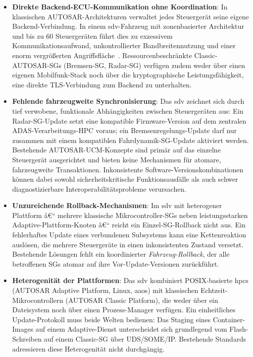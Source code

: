 ﻿\documentclass[12pt,a4paper,twoside]{article}
\begin{document}
\begin{itemize}[leftmargin=*]
  \item \textbf{Direkte Backend-ECU-Kommunikation ohne Koordination}:
    In klassischen AUTO\-SAR-Architekturen verwaltet jedes Steuergerät
    seine eigene Backend-Verbindung. In einem \gls{sdv}-Fahrzeug mit
    zonenbasierter Architektur und bis zu 60 Steuergeräten führt dies
    zu exzessivem Kommunikationsaufwand, unkontrollierter Bandbreitennutzung
    und einer enorm vergrößerten Angriffsfläche~\cite{halder2020secure}.
    Ressourcenbeschränkte Classic-AUTOSAR-SGs (Bremsen-SG, Radar-SG)
    verfügen zudem weder über einen eigenen Mobilfunk-Stack noch über
    die kryptographische Leistungsfähigkeit, eine direkte TLS-Verbindung
    zum Backend zu unterhalten.

  \item \textbf{Fehlende fahrzeugweite Synchronisierung}:
    Das \gls{sdv} zeichnet sich durch tief verwobene, funktionale
    Abhängigkeiten zwischen Steuergeräten aus: Ein Radar-SG-Update
    setzt eine kompatible Firmware-Version auf dem zentralen
    ADAS-Verarbeitungs-HPC voraus; ein Bremsenregelungs-Update
    darf nur zusammen mit einem kompatiblen Fahrdynamik-SG-Update
    aktiviert werden. Bestehende AUTOSAR-UCM-Konzepte sind primär
    auf das einzelne Steuergerät ausgerichtet und bieten keine
    Mechanismen für atomare, fahrzeugweite Transaktionen.
    Inkonsistente Software-Versionskombinationen können dabei
    sowohl sicherheitskritische Funktionsausfälle als auch
    schwer diagnostizierbare Interoperabilitätsprobleme verursachen.

  \item \textbf{Unzureichende Rollback-Mechanismen}:
    Im \gls{sdv} mit heterogener Plattform â€“ mehrere klassische
    Mikrocontroller-SGs neben leistungsstarken Adaptive-Plattform-Knoten â€“
    reicht ein Einzel-SG-Rollback nicht aus. Ein fehlerhaftes Update
    eines verbundenen Subsystems kann eine Kettenreaktion auslösen,
    die mehrere Steuergeräte in einen inkonsistenten Zustand versetzt.
    Bestehende Lösungen fehlt ein koordinierter \emph{Fahrzeug-Rollback},
    der alle betroffenen SGs atomar auf ihre Vor-Update-Versionen
    zurückführt.

  \item \textbf{Heterogenität der Plattformen}:
    Das \gls{sdv} kombiniert POSIX-basierte \glspl{hpc} (AUTOSAR Adaptive
    Platform, Linux, \gls{aaos}) mit klassischen Echtzeit-Mikrocontrollern
    (AUTOSAR Classic Platform), die weder über ein Dateisystem noch
    über einen Prozess-Manager verfügen. Ein einheitliches Update-Protokoll
    muss beide Welten bedienen: Das Staging eines Container-Images auf
    einem Adaptive-Dienst unterscheidet sich grundlegend vom Flash-Schreiben
    auf einem Classic-SG über UDS/SOME/IP. Bestehende Standards adressieren
    diese Heterogenität nicht durchgängig.


\end{itemize}
\end{document}
